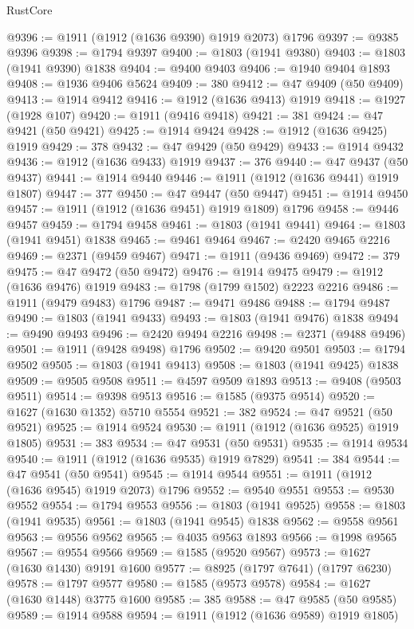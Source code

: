 \begin{lexlean}{RustCore}
\begin{coremodule}
@9396 := @1911 (@1912 (@1636 @9390) @1919 @2073) @1796
@9397 := @9385 @9396
@9398 := @1794 @9397
@9400 := @1803 (@1941 @9380)
@9403 := @1803 (@1941 @9390) @1838
@9404 := @9400 @9403
@9406 := @1940 @9404 @1893
@9408 := @1936 @9406 @5624
@9409 := 380
@9412 := @47 @9409 (@50 @9409)
@9413 := @1914 @9412
@9416 := @1912 (@1636 @9413) @1919
@9418 := @1927 (@1928 @107)
@9420 := @1911 (@9416 @9418)
@9421 := 381
@9424 := @47 @9421 (@50 @9421)
@9425 := @1914 @9424
@9428 := @1912 (@1636 @9425) @1919
@9429 := 378
@9432 := @47 @9429 (@50 @9429)
@9433 := @1914 @9432
@9436 := @1912 (@1636 @9433) @1919
@9437 := 376
@9440 := @47 @9437 (@50 @9437)
@9441 := @1914 @9440
@9446 := @1911 (@1912 (@1636 @9441) @1919 @1807)
@9447 := 377
@9450 := @47 @9447 (@50 @9447)
@9451 := @1914 @9450
@9457 := @1911 (@1912 (@1636 @9451) @1919 @1809) @1796
@9458 := @9446 @9457
@9459 := @1794 @9458
@9461 := @1803 (@1941 @9441)
@9464 := @1803 (@1941 @9451) @1838
@9465 := @9461 @9464
@9467 := @2420 @9465 @2216
@9469 := @2371 (@9459 @9467)
@9471 := @1911 (@9436 @9469)
@9472 := 379
@9475 := @47 @9472 (@50 @9472)
@9476 := @1914 @9475
@9479 := @1912 (@1636 @9476) @1919
@9483 := @1798 (@1799 @1502) @2223 @2216
@9486 := @1911 (@9479 @9483) @1796
@9487 := @9471 @9486
@9488 := @1794 @9487
@9490 := @1803 (@1941 @9433)
@9493 := @1803 (@1941 @9476) @1838
@9494 := @9490 @9493
@9496 := @2420 @9494 @2216
@9498 := @2371 (@9488 @9496)
@9501 := @1911 (@9428 @9498) @1796
@9502 := @9420 @9501
@9503 := @1794 @9502
@9505 := @1803 (@1941 @9413)
@9508 := @1803 (@1941 @9425) @1838
@9509 := @9505 @9508
@9511 := @4597 @9509 @1893
@9513 := @9408 (@9503 @9511)
@9514 := @9398 @9513
@9516 := @1585 (@9375 @9514)
@9520 := @1627 (@1630 @1352) @5710 @5554
@9521 := 382
@9524 := @47 @9521 (@50 @9521)
@9525 := @1914 @9524
@9530 := @1911 (@1912 (@1636 @9525) @1919 @1805)
@9531 := 383
@9534 := @47 @9531 (@50 @9531)
@9535 := @1914 @9534
@9540 := @1911 (@1912 (@1636 @9535) @1919 @7829)
@9541 := 384
@9544 := @47 @9541 (@50 @9541)
@9545 := @1914 @9544
@9551 := @1911 (@1912 (@1636 @9545) @1919 @2073) @1796
@9552 := @9540 @9551
@9553 := @9530 @9552
@9554 := @1794 @9553
@9556 := @1803 (@1941 @9525)
@9558 := @1803 (@1941 @9535)
@9561 := @1803 (@1941 @9545) @1838
@9562 := @9558 @9561
@9563 := @9556 @9562
@9565 := @4035 @9563 @1893
@9566 := @1998 @9565
@9567 := @9554 @9566
@9569 := @1585 (@9520 @9567)
@9573 := @1627 (@1630 @1430) @9191 @1600
@9577 := @8925 (@1797 @7641) (@1797 @6230)
@9578 := @1797 @9577
@9580 := @1585 (@9573 @9578)
@9584 := @1627 (@1630 @1448) @3775 @1600
@9585 := 385
@9588 := @47 @9585 (@50 @9585)
@9589 := @1914 @9588
@9594 := @1911 (@1912 (@1636 @9589) @1919 @1805)

\end{coremodule}
\end{lexlean}
